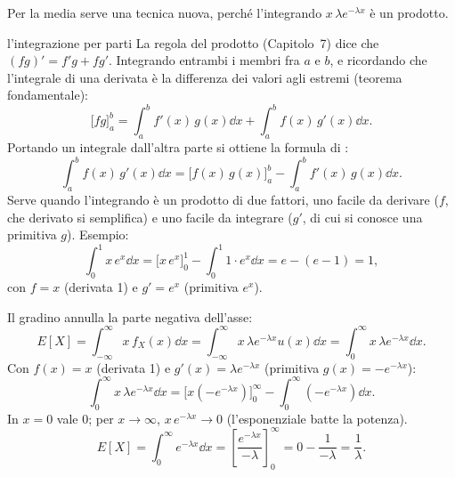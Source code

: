 Per la media serve una tecnica nuova, perché l'integrando $x\, \lambda e^{-\lambda x}$ è un prodotto.

\begin{richiamo}{l'integrazione per parti}
La regola del prodotto (Capitolo~7) dice che $(f g)' = f' g + f g'$. Integrando entrambi i membri fra $a$ e $b$, e
ricordando che l'integrale di una derivata è la differenza dei valori agli estremi (teorema fondamentale):
\[ \Big[ f g \Big]_a^b = \int_a^b f'(x)\, g(x) \dd x + \int_a^b f(x)\, g'(x) \dd x . \]
Portando un integrale dall'altra parte si ottiene la formula di :
\[ \int_a^b f(x)\, g'(x) \dd x = \Big[ f(x)\, g(x) \Big]_a^b - \int_a^b f'(x)\, g(x) \dd x . \]
Serve quando l'integrando è un prodotto di due fattori, uno facile da derivare ($f$, che derivato si semplifica) e uno
facile da integrare ($g'$, di cui si conosce una primitiva $g$). Esempio:
\[ \int_0^1 x\, e^x \dd x = \Big[ x\, e^x \Big]_0^1 - \int_0^1 1 \cdot e^x \dd x = e - (e - 1) = 1 , \]
con $f = x$ (derivata 1) e $g' = e^x$ (primitiva $e^x$).
\end{richiamo}


\begin{dimostrazione}
 Il gradino annulla la parte negativa dell'asse:
\[ E[X] = \int_{-\infty}^{\infty} x\, f_X(x) \dd x = \int_{-\infty}^{\infty} x\, \lambda e^{-\lambda x} u(x) \dd x =
   \int_0^{\infty} x\, \lambda e^{-\lambda x} \dd x . \]
 Con $f(x) = x$ (derivata 1) e $g'(x) = \lambda e^{-\lambda x}$ (primitiva $g(x) = -e^{-\lambda x}$):
\[ \int_0^{\infty} x\, \lambda e^{-\lambda x} \dd x = \Big[ x \left( -e^{-\lambda x} \right) \Big]_0^{\infty} -
   \int_0^{\infty} \left( -e^{-\lambda x} \right) \dd x . \]
 In $x = 0$ vale $0$; per $x \to \infty$, $x\, e^{-\lambda x} \to 0$ (l'esponenziale
batte la potenza).
\[ E[X] = \int_0^{\infty} e^{-\lambda x} \dd x = \left[ \frac{e^{-\lambda x}}{-\lambda} \right]_0^{\infty} = 0 -
   \frac{1}{-\lambda} = \frac{1}{\lambda} . \]
\end{dimostrazione}

